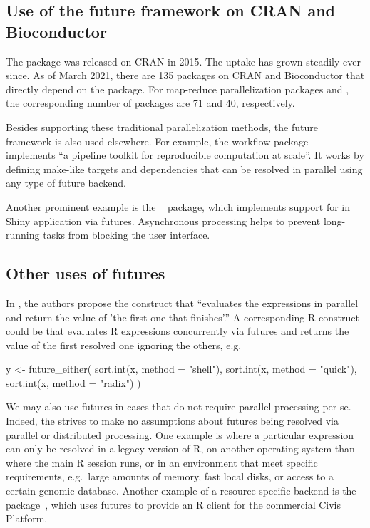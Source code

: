 \subsection{Use of the future framework on CRAN and Bioconductor}
\label{use-of-the-future-framework}

The  package was released on CRAN in 2015. The uptake has
grown steadily ever since.  As of March 2021, there are 135 packages on
CRAN and Bioconductor that directly depend on the 
package.  For map-reduce parallelization packages 
and
, the corresponding number of packages are 71 and 40,
respectively.

Besides supporting these traditional parallelization methods, the
future framework is also used elsewhere.  For example, the workflow
package ~\citep{Landau_2018} implements ``a pipeline
toolkit for reproducible computation at scale''.  It works by defining
make-like targets and dependencies that can be resolved in parallel
using any type of future backend.

Another prominent example is the ~\citep{CRAN:shiny}
package, which implements support for  in
Shiny application via futures.  Asynchronous processing helps to
prevent long-running tasks from blocking the user interface.


\subsection{Other uses of futures}
\label{other-usages}

In \citet{HewittBaker_1977}, the authors propose the
 construct that ``evaluates the expressions in
parallel and return the value of 'the first one that finishes'.''  A
corresponding R construct could be  that
evaluates R expressions concurrently via futures and returns the value
of the first resolved one ignoring the others, e.g.
\begin{example}
y <- future_either(
  sort.int(x, method = "shell"),
  sort.int(x, method = "quick"),
  sort.int(x, method = "radix")
)
\end{example}

We may also use futures in cases that do not require parallel
processing per se.  Indeed, the  strives to make no
assumptions about futures being resolved via parallel or distributed
processing.  One example is where a particular expression can only be
resolved in a legacy version of R, on another operating system than
where the main R session runs, or in an environment that meet specific
requirements, e.g.\ large amounts of memory, fast local disks, or
access to a certain genomic database.  Another example of a
resource-specific backend is the 
package~\citep{CRAN:civis}, which uses futures to provide an R client
for the commercial Civis Platform.

